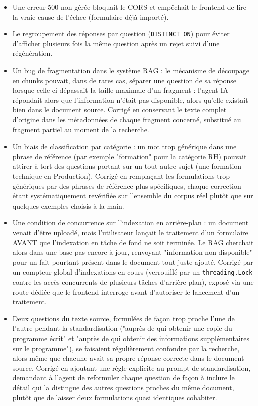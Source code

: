 \documentclass[12pt,a4paper]{report}
\begin{document}
\begin{itemize}
    \item Une erreur 500 non gérée bloquait le CORS et empêchait le frontend
    de lire la vraie cause de l'échec (formulaire déjà importé).
    \item Le regroupement des réponses par question (\texttt{DISTINCT ON})
    pour éviter d'afficher plusieurs fois la même question après un rejet
    suivi d'une régénération.
    \item Un bug de fragmentation dans le système RAG : le mécanisme de
    découpage en chunks pouvait, dans de rares cas, séparer une question
    de sa réponse lorsque celle-ci dépassait la taille maximale d'un
    fragment : l'agent IA répondait alors que l'information n'était pas
    disponible, alors qu'elle existait bien dans le document source.
    Corrigé en conservant le texte complet d'origine dans les métadonnées
    de chaque fragment concerné, substitué au fragment partiel au moment
    de la recherche.
    \item Un biais de classification par catégorie : un mot trop
    générique dans une phrase de référence (par exemple "formation" pour
    la catégorie RH) pouvait attirer à tort des questions portant sur un
    tout autre sujet (une formation technique en Production). Corrigé en
    remplaçant les formulations trop génériques par des phrases de
    référence plus spécifiques, chaque correction étant systématiquement
    revérifiée sur l'ensemble du corpus réel plutôt que sur quelques
    exemples choisis à la main.
    \item Une condition de concurrence sur l'indexation en arrière-plan :
    un document venait d'être uploadé, mais l'utilisateur lançait le
    traitement d'un formulaire AVANT que l'indexation en tâche de fond ne
    soit terminée. Le RAG cherchait alors dans une base pas encore à
    jour, renvoyant "information non disponible" pour un fait pourtant
    présent dans le document tout juste ajouté. Corrigé par un compteur
    global d'indexations en cours (verrouillé par un \texttt{threading.Lock}
    contre les accès concurrents de plusieurs tâches d'arrière-plan),
    exposé via une route dédiée que le frontend interroge avant d'autoriser
    le lancement d'un traitement.
    \item Deux questions du texte source, formulées de façon trop
    proche l'une de l'autre pendant la standardisation ("auprès de qui
    obtenir une copie du programme écrit" et "auprès de qui obtenir des
    informations supplémentaires sur le programme"), se faisaient
    régulièrement confondre par la recherche, alors même que chacune
    avait sa propre réponse correcte dans le document source. Corrigé en
    ajoutant une règle explicite au prompt de standardisation, demandant
    à l'agent de reformuler chaque question de façon à inclure le détail
    qui la distingue des autres questions proches du même document,
    plutôt que de laisser deux formulations quasi identiques cohabiter.
\end{itemize}
\end{document}
